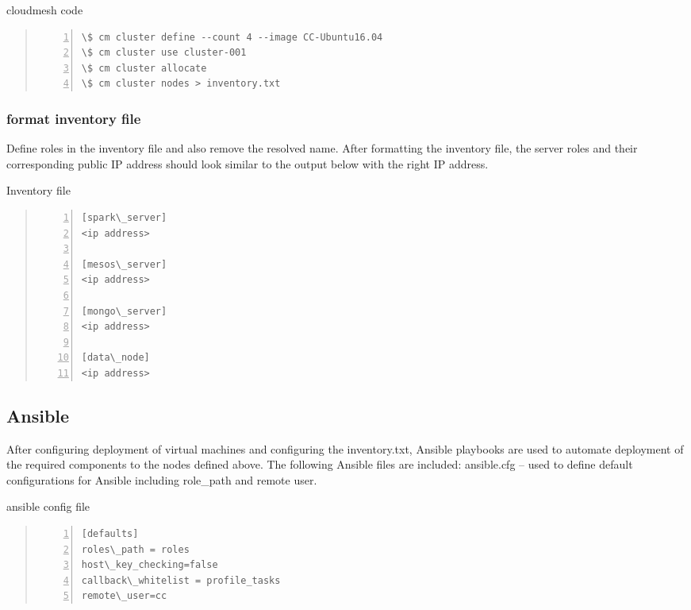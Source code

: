 \documentclass[9pt,twocolumn,twoside]{../../styles/osajnl}
\begin{document}
\begin{algorithm}
\caption{cloudmesh code}\label{alg:python}
\begin{quote}
\begin{Verbatim}[numbers=left]
\$ cm cluster define --count 4 --image CC-Ubuntu16.04
\$ cm cluster use cluster-001
\$ cm cluster allocate
\$ cm cluster nodes > inventory.txt 
\end{Verbatim}
\end{quote}
\end{algorithm}

\subsubsection {format inventory file}
Define roles in the inventory file and also remove the resolved
name. After formatting the inventory file, the server roles and their
corresponding public IP address should look similar to the output
below with the right IP address.

\begin{algorithm}
\caption{Inventory file}\label{alg:python}
\begin{quote}
\begin{Verbatim}[numbers=left]
[spark\_server]
<ip address> 

[mesos\_server]
<ip address>

[mongo\_server]
<ip address>

[data\_node]
<ip address>
\end{Verbatim}
\end{quote}
\end{algorithm}

\subsection{Ansible}
After configuring deployment of virtual machines and configuring the
inventory.txt, Ansible playbooks are used to automate deployment of
the required components to the nodes defined above.
The following Ansible files are included:
ansible.cfg – used to define default configurations for Ansible including role\_path and remote user.

\begin{algorithm}
\caption{ansible config file}\label{alg:python}
\begin{quote}
\begin{Verbatim}[numbers=left]
[defaults]
roles\_path = roles
host\_key_checking=false
callback\_whitelist = profile_tasks
remote\_user=cc
\end{Verbatim}
\end{quote}
\end{algorithm}
\end{document}
